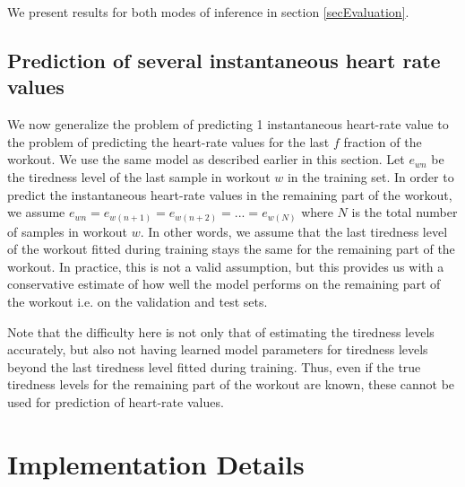 \documentclass{acm_proc_article-sp}
\begin{document}
We present results for both modes of inference in section \ref{secEvaluation}.

\subsection{Prediction of several instantaneous heart rate values}
We now generalize the problem of predicting 1 instantaneous heart-rate value to the problem of predicting the heart-rate values for the last $f$ fraction of the workout. We use the same model as described earlier in this section. Let $e_{wn}$ be the tiredness level of the last sample in workout $w$ in the training set. In order to predict the instantaneous heart-rate values in the remaining part of the workout, we assume $e_{wn} = e_{w(n+1)} = e_{w(n+2)} = ... = e_{w(N)}$ where $N$ is the total number of samples in workout $w$. In other words, we assume that the last tiredness level of the workout fitted during training stays the same for the remaining part of the workout. In practice, this is not a valid assumption, but this provides us with a conservative estimate of how well the model performs on the remaining part of the workout i.e. on the validation and test sets.

Note that the difficulty here is not only that of estimating the tiredness levels accurately, but also not having learned model parameters for tiredness levels beyond the last tiredness level fitted during training. Thus, even if the true tiredness levels for the remaining part of the workout are known, these cannot be used for prediction of heart-rate values.

\section{Implementation Details}
\label{secImplementationDetails}
\end{document}
